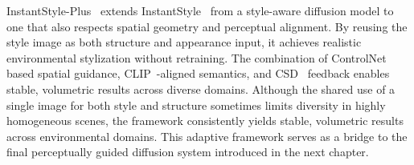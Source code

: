 InstantStyle-Plus~\cite{wang2024instantstyleplus} extends InstantStyle~\cite{wang2024instantstyle} from a style-aware diffusion model to one that also respects spatial geometry and perceptual alignment.  
By reusing the style image as both structure and appearance input, it achieves realistic environmental stylization without retraining.  
The combination of ControlNet~\cite{zhang2023controlnet} based spatial guidance, CLIP~\cite{radford2021clip}-aligned semantics, and CSD~\cite{somepalli2024csd} feedback enables stable, volumetric results across diverse domains.  
Although the shared use of a single image for both style and structure sometimes limits diversity in highly homogeneous scenes, the framework consistently yields stable, volumetric results across environmental domains.  
This adaptive framework serves as a bridge to the final perceptually guided diffusion system introduced in the next chapter.
